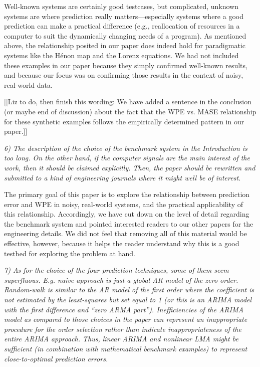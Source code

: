 \documentclass[12pt]{article}
\newcommand{\alert}[1]{{\color{red}#1}}
\begin{document}
Well-known systems are certainly good testcases, but complicated,
unknown systems are where prediction really matters---especially
systems where a good prediction can make a practical difference (e.g.,
reallocation of resources in a computer to suit the dynamically
changing needs of a program).  As mentioned above, the relationship
posited in our paper does indeed hold for paradigmatic systems like
the H\'{e}non map and the Lorenz equations.  We had not included these
examples in our paper because they simply confirmed well-known
results, and because our focus was on confirming those results in the
context of noisy, real-world data.  


\alert{[[Liz to do, then finish
      this wording: We have added a sentence in the conclusion (or
      maybe end of discussion) about the fact that the WPE vs. MASE
      relationship for these synthetic examples follows the
      empirically determined pattern in our paper.]]}

\smallskip

\emph{6) The description of the choice of the benchmark system in the
  Introduction is too long. On the other hand, if the computer signals
  are the main interest of the work, then it should be claimed
  explicitly. Then, the paper should be rewritten and submitted to a
  kind of engineering journals where it might well be of interest.}

The primary goal of this paper is to explore the relationship between
prediction error and WPE in noisy, real-world systems, and the
practical applicability of this relationship.  Accordingly, we have
cut down on the level of detail regarding the benchmark system and
pointed interested readers to our other papers for the engineering
details.  We did not feel that removing all of this material would
be effective, however, because it helps the reader understand why
this is a good testbed for exploring the problem at hand.

\smallskip

\emph{7) As for the choice of the four prediction techniques, some of
  them seem superfluous. E.g. naive approach is just a global AR model
  of the zero order.  Random-walk is similar to the AR model of the
  first order where the coefficient is not estimated by the
  least-squares but set equal to 1 (or this is an ARIMA model with the
  first difference and ``zero ARMA part''). Inefficiencies of the
  ARIMA model as compared to those choices in the paper can represent
  an inappropriate procedure for the order selection rather than
  indicate inappropriateness of the entire ARIMA approach. Thus,
  linear ARIMA and nonlinear LMA might be sufficient (in combination
  with mathematical benchmark examples) to represent close-to-optimal
  prediction errors.}
\end{document}
